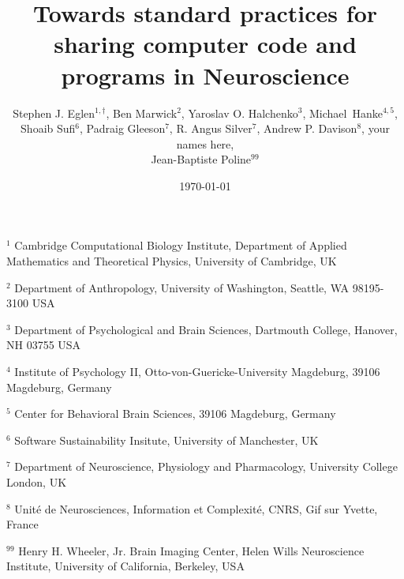 \documentclass[11pt]{article}
\begin{document}
\doublespacing

\title{Towards standard practices for sharing computer code and programs in Neuroscience}

\author{Stephen J. Eglen$^{1,\dagger}$, Ben Marwick${^2}$, Yaroslav
  O. Halchenko${^3}$, Michael~Hanke${^{4,5}}$,
  \\
  Shoaib Sufi$^6$,
  Padraig Gleeson$^7$, R. Angus Silver$^7$,
  Andrew P. Davison$^8$,
  your names here,\\
  Jean-Baptiste Poline$^{99}$}
\date{\today}
\maketitle

\noindent $^{1}$ 
Cambridge Computational Biology Institute,
Department of Applied Mathematics and Theoretical Physics,
University of Cambridge, UK
\vspace*{2mm}

\noindent $^{2}$ 
Department of Anthropology,
University of Washington,
Seattle, WA 98195-3100 USA 
\vspace*{2mm}

\noindent $^{3}$
Department of Psychological and Brain Sciences,
Dartmouth College,
Hanover, NH 03755 USA
\vspace*{2mm}

\noindent $^{4}$
Institute of Psychology II, Otto-von-Guericke-University Magdeburg, 39106 Magdeburg, Germany
\vspace*{2mm}

\noindent $^{5}$
Center for Behavioral Brain Sciences, 39106 Magdeburg, Germany
\vspace*{2mm}

\noindent $^{6}$
Software Sustainability Insitute, University of Manchester, UK
\vspace*{2mm}

\noindent $^{7}$
Department of Neuroscience, Physiology and Pharmacology, University College London, UK
\vspace*{2mm}

\noindent $^{8}$
Unit\'{e} de Neurosciences, Information et Complexit\'{e}, CNRS, Gif sur Yvette, France
\vspace*{2mm}

\noindent $^{99}$  Henry H. Wheeler, Jr. Brain Imaging Center, Helen Wills Neuroscience Institute, University of California, Berkeley, USA
\vspace*{2mm}
\end{document}
